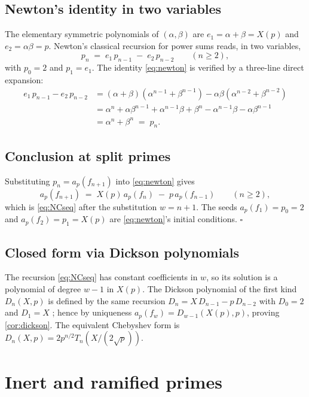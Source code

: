 \documentclass[11pt]{amsart}
\theoremstyle{definition}
\theoremstyle{remark}
\begin{document}
\subsection{Newton's identity in two variables}
The elementary symmetric polynomials of $(\alpha, \beta)$ are
$e_1 = \alpha + \beta = X(p)$ and $e_2 = \alpha \beta = p$.
Newton's classical recursion for power sums
\cite[\S I.2]{Macdonald1995} reads, in two variables,
\begin{equation}\label{eq:newton}
  p_n \;=\; e_1\, p_{n-1} \;-\; e_2\, p_{n-2}
  \qquad (n \ge 2),
\end{equation}
with $p_0 = 2$ and $p_1 = e_1$. The identity \cref{eq:newton} is
verified by a three-line direct expansion:
\begin{align*}
  e_1\, p_{n-1} - e_2\, p_{n-2}
  &= (\alpha + \beta)(\alpha^{n-1} + \beta^{n-1}) - \alpha\beta
   (\alpha^{n-2} + \beta^{n-2}) \\
  &= \alpha^n + \alpha\beta^{n-1} + \alpha^{n-1}\beta + \beta^n
   - \alpha^{n-1}\beta - \alpha\beta^{n-1} \\
  &= \alpha^n + \beta^n \;=\; p_n.
\end{align*}

\subsection{Conclusion at split primes}
Substituting $p_n = a_p(f_{n+1})$ into \cref{eq:newton} gives
\[
  a_p(f_{n+1}) \;=\; X(p)\, a_p(f_n) \;-\; p\, a_p(f_{n-1})
  \qquad (n \ge 2),
\]
which is \cref{eq:NCseq} after the substitution $w = n+1$. The
seeds $a_p(f_1) = p_0 = 2$ and $a_p(f_2) = p_1 = X(p)$ are
\cref{eq:newton}'s initial conditions. \hfill $\square$

\subsection{Closed form via Dickson polynomials}
The recursion \cref{eq:NCseq} has constant coefficients in $w$, so
its solution is a polynomial of degree $w-1$ in $X(p)$. The Dickson
polynomial of the first kind $D_n(X, p)$ is defined by the same
recursion $D_n = X\, D_{n-1} - p\, D_{n-2}$ with $D_0 = 2$ and
$D_1 = X$ \cite{Dickson1897}; hence by uniqueness $a_p(f_w) =
D_{w-1}(X(p), p)$, proving \cref{cor:dickson}. The equivalent
Chebyshev form is $D_n(X, p) = 2 p^{n/2} T_n(X / (2\sqrt{p}))$.

\section{Inert and ramified primes}\label{sec:inert-ramified}
\end{document}
